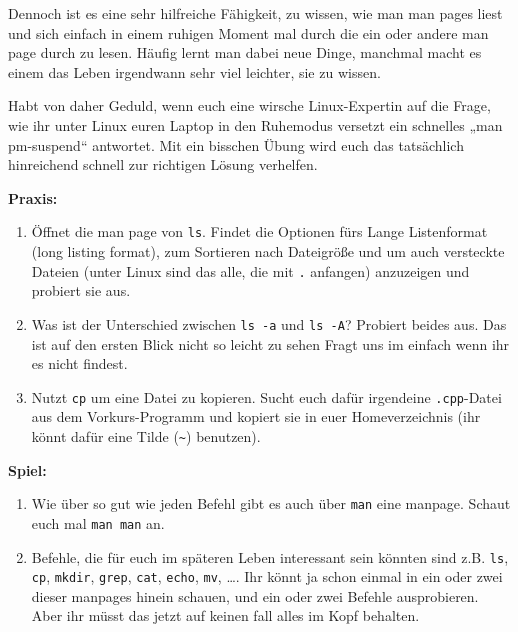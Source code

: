 Dennoch ist es eine sehr hilfreiche Fähigkeit, zu wissen, wie man man pages
liest und sich einfach in einem ruhigen Moment mal durch die ein oder andere
man page durch zu lesen. Häufig lernt man dabei neue Dinge, manchmal macht es
einem das Leben irgendwann sehr viel leichter, sie zu wissen.

Habt von daher Geduld, wenn euch eine wirsche Linux-Expertin auf die Frage, wie
ihr unter Linux euren Laptop in den Ruhemodus versetzt ein schnelles „man
pm-suspend“ antwortet. Mit ein bisschen Übung wird euch das tatsächlich
hinreichend schnell zur richtigen Lösung verhelfen.

\textbf{Praxis:}
\begin{enumerate}[resume]
    \item Öffnet die man page von \texttt{ls}. Findet die Optionen fürs Lange
				Listenformat (long listing format), zum Sortieren nach Dateigröße
				und um auch versteckte Dateien (unter Linux sind das alle, die mit
				\texttt{.} anfangen) anzuzeigen und probiert sie aus.
    \item Was ist der Unterschied zwischen \texttt{ls -a} und \texttt{ls -A}?
        Probiert beides aus. Das ist auf den ersten Blick nicht so leicht zu sehen
				Fragt uns im einfach wenn ihr es nicht findest.
    \item Nutzt \texttt{cp} um eine Datei zu kopieren. Sucht euch dafür
        irgendeine \texttt{.cpp}-Datei aus dem Vorkurs-Programm und kopiert sie
        in euer Homeverzeichnis (ihr könnt dafür eine Tilde (\texttt{\~})
        benutzen).
\end{enumerate}

\textbf{Spiel:}
\begin{enumerate}
    \item Wie über so gut wie jeden Befehl gibt es auch über \texttt{man} eine
        manpage. Schaut euch mal \texttt{man man} an.
    \item Befehle, die für euch im späteren Leben interessant sein könnten sind
        z.B. \texttt{ls}, \texttt{cp}, \texttt{mkdir}, \texttt{grep}, \texttt{cat},
        \texttt{echo}, \texttt{mv}, \dots. Ihr könnt ja schon einmal in ein
        oder zwei dieser manpages hinein schauen, und ein oder zwei Befehle
        ausprobieren. Aber ihr müsst das jetzt auf keinen fall alles im Kopf
				behalten.
\end{enumerate}
